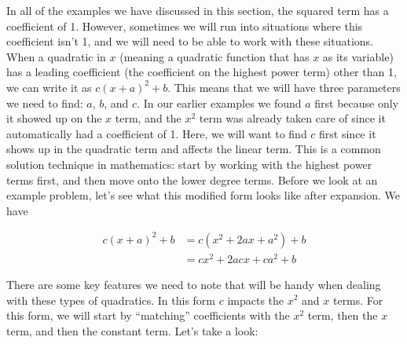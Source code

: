 In all of the examples we have discussed in this section, the squared term has a coefficient of 1. However, sometimes we will run into situations where this coefficient isn't 1, and we will need to be able to work with these situations. When a quadratic in $x$ (meaning a quadratic function that has $x$ as its variable) has a leading coefficient (the coefficient on the highest power term) other than 1, we can write it as $c(x+a)^2 +b$. This means that we will have three parameters we need to find: $a$, $b$, and $c$. In our earlier examples we found $a$ first because only it showed up on the $x$ term, and the $x^2$ term was already taken care of since it automatically had a coefficient of 1. Here, we will want to find $c$ first since it shows up in the quadratic term and affects the linear term. This is a common solution technique in mathematics: start by working with the highest power terms first, and then move onto the lower degree terms. Before we look at an example problem, let's see what this modified form looks like after expansion. We have



\begin{equation}\label{eqn:complete_square_variation2}
	\begin{split}
		c(x+a)^2 + b & = c(x^2 + 2ax + a^2) + b \\
			     & = cx^2 + 2acx + ca^2 +b
	\end{split}
\end{equation}

There are some key features we need to note that will be handy when dealing with these types of quadratics. In this form $c$ impacts the $x^2$ and $x$ terms. For this form, we will start by ``matching'' coefficients with the $x^2$ term, then the $x$ term, and then the constant term. Let's take a look:



